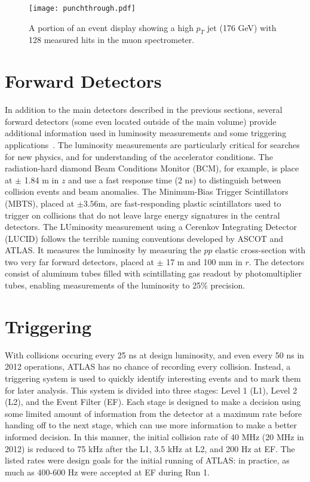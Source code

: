 
\begin{figure}
\centering
\texttt{[image: punchthrough.pdf]}
\caption{A portion of an event display showing a high $p_T$ jet (176 GeV) with 128 measured hits in the muon spectrometer.}
\label{fig:detector:punchthrough}
\end{figure}


\section{Forward Detectors}

In addition to the main detectors described in the previous sections, several forward detectors (some even located outside of the main volume) provide additional information used in luminosity measurements and some triggering applications~\cite{ATLASPaper}. The luminosity measurements are particularly critical for searches for new physics, and for understanding of the accelerator conditions. The radiation-hard diamond Beam Conditions Monitor (BCM), for example, is place at $\pm$ 1.84 m in $z$ and use a fast response time (2 ns) to distinguish between collision events and beam anomalies. The Minimum-Bias Trigger Scintillators (MBTS), placed at $\pm 3.56$m, are fast-responding plastic scintillators used to trigger on collisions that do not leave large energy signatures in the central detectors. The LUminosity measurement using a Cerenkov Integrating Detector (LUCID) follows the terrible naming conventions developed by ASCOT and ATLAS. It measures the luminosity by measuring the $pp$ elastic cross-section with two very far forward detectors, placed at $\pm$ 17 m and 100 mm in $r$. The detectors consist of aluminum tubes filled with scintillating gas readout by photomultiplier tubes, enabling measurements of the luminosity to 25$\%$ precision.

\section{Triggering}

With collisions occuring every 25 ns at design luminosity, and even every 50 ns in 2012 operations, ATLAS has no chance of recording every collision. Instead, a triggering system is used to quickly identify interesting events and to mark them for later analysis\cite{ATLASPaper,Trigger2010}. This system is divided into three stages: Level 1 (L1), Level 2 (L2), and the Event Filter (EF). Each stage is designed to make a decision using some limited amount of information from the detector at a maximum rate before handing off to the next stage, which can use more information to make a better informed decision. In this manner, the initial collision rate of 40 MHz (20 MHz in 2012) is reduced to 75 kHz after the L1, 3.5 kHz at L2, and 200 Hz at EF. The listed rates were design goals for the initial running of ATLAS: in practice, as much as 400-600 Hz were accepted at EF during Run 1.


